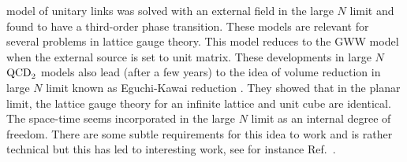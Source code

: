 \documentclass[letter,11pt]{article}
\begin{document}
model of unitary links was solved with an external field in the large $N$ limit and found to have a third-order phase transition. These models are relevant for several problems in lattice gauge theory. This model reduces to the GWW model when the external source is set to unit matrix. These developments in large $N$ $\rm{QCD}_{2}$ models also lead (after a few years) to the idea of volume reduction in large $N$ limit known as Eguchi-Kawai reduction \cite{Eguchi:1982nm}. They showed that in the planar limit, the lattice gauge theory for an infinite lattice and unit cube are identical. The space-time seems incorporated in the large $N$ limit as an internal degree of freedom. There are some subtle requirements for this idea to work and is rather technical but this has led to interesting work, see for instance Ref.~\cite{Kovtun:2007py}. 

\end{document}
